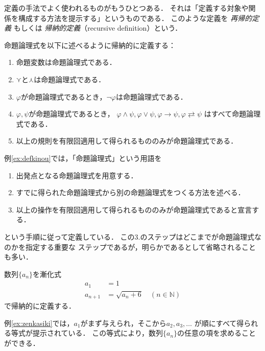   定義の手法でよく使われるものがもうひとつある．
  それは「定義する対象や関係を構成する方法を提示する」というものである．
  このような定義を %
  \emph{再帰的定義} もしくは
  \emph{帰納的定義}（recursive definition）という．
  \begin{ex} \label{ex:defkinou}
    命題論理式を以下に述べるように帰納的に定義する：
    \begin{enumerate}[(1) ]
      \item 命題変数は命題論理式である．
      \item $\curlyvee$と$\curlywedge$は命題論理式である．
      \item $\varphi$が命題論理式であるとき，$\lnot \varphi$は命題論理式である．
      \item $\varphi , \psi$が命題論理式であるとき，
        $\varphi \land \psi , \varphi \lor \psi , \varphi \to \psi , 
        \varphi \rightleftarrows \psi$
        はすべて命題論理式である．
      \item 以上の規則を有限回適用して得られるもののみが命題論理式である．
    \end{enumerate}
  \end{ex}

  例\ref{ex:defkinou}では，「命題論理式」という用語を
  \begin{enumerate}[1. ]
    \item 出発点となる命題論理式を用意する．
    \item すでに得られた命題論理式から別の命題論理式をつくる方法を述べる．
    \item 以上の操作を有限回適用して得られるもののみが命題論理式であると宣言する．
  \end{enumerate}
  という手順に従って定義している．
  この3.のステップはどこまでが命題論理式なのかを指定する重要な
  ステップであるが，明らかであるとして省略されることも多い．
  \begin{ex} \label{ex:zenkasiki}
    数列$\{ a_n \}$を漸化式
    \begin{align*}
      a_1 & = 1 \\
      a_{n+1} & = \sqrt{ a_n + 6} \quad ( n \in \mathbb{N} ) 
    \end{align*}
    で帰納的に定義する．
  \end{ex}

  例\ref{ex:zenkasiki}では，$a_1$がまず与えられ，そこから$a_2 , a_3 , \ldots$
  が順にすべて得られる等式が提示されている．
  この等式により，数列$\{ a_n \}$の任意の項を求めることができる．


